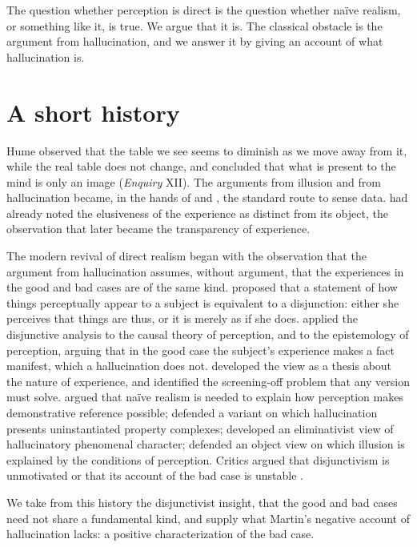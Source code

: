 \documentclass{situationist-preprint}
\begin{document}
The question whether perception is direct is the question whether naïve realism, or something like it, is true. We argue that it is. The classical obstacle is the argument from hallucination, and we answer it by giving an account of what hallucination is.

\section{A short history}

Hume observed that the table we see seems to diminish as we move away from it, while the real table does not change, and concluded that what is present to the mind is only an image (\emph{Enquiry} XII). The arguments from illusion and from hallucination became, in the hands of \citet{Russell1912} and \citet{Ayer1940}, the standard route to sense data. \citet{Moore1903} had already noted the elusiveness of the experience as distinct from its object, the observation that later became the transparency of experience.

The modern revival of direct realism began with the observation that the argument from hallucination assumes, without argument, that the experiences in the good and bad cases are of the same kind. \citet{Hinton1973} proposed that a statement of how things perceptually appear to a subject is equivalent to a disjunction: either she perceives that things are thus, or it is merely as if she does. \citet{Snowdon1981} applied the disjunctive analysis to the causal theory of perception, and \citet{McDowell1982} to the epistemology of perception, arguing that in the good case the subject's experience makes a fact manifest, which a hallucination does not. \citet{Martin2002,Martin2004,Martin2006} developed the view as a thesis about the nature of experience, and identified the screening-off problem that any version must solve. \citet{Campbell2002} argued that naïve realism is needed to explain how perception makes demonstrative reference possible; \citet{Johnston2004} defended a variant on which hallucination presents uninstantiated property complexes; \citet{Fish2009} developed an eliminativist view of hallucinatory phenomenal character; \citet{Brewer2011} defended an object view on which illusion is explained by the conditions of perception. Critics argued that disjunctivism is unmotivated or that its account of the bad case is unstable \citep{Robinson1994,ByrneLogue2008}.

We take from this history the disjunctivist insight, that the good and bad cases need not share a fundamental kind, and supply what Martin's negative account of hallucination lacks: a positive characterization of the bad case.
\end{document}
